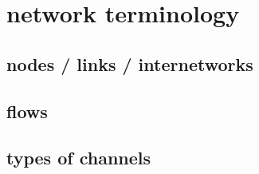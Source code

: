 \documentclass{ltx-talk}
\begin{document}
\section{network terminology}

\subsection{nodes / links / internetworks}



\subsection{flows}



\subsection{types of channels}


\end{document}
